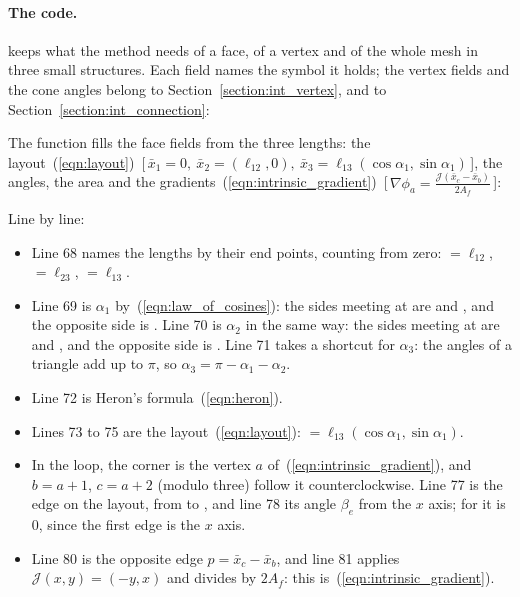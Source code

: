 \paragraph{The code.}  keeps what the method needs of a face, of a vertex and of the whole mesh in three small structures. Each field names the symbol it holds; the vertex fields and the cone angles  belong to Section~\ref{section:int_vertex}, and  to Section~\ref{section:int_connection}:

The function  fills the face fields from the three lengths: the layout~(\ref{eqn:layout})~[\,$\bar x_1 = 0,\ \bar x_2 = (\ell_{12}, 0),\ \bar x_3 = \ell_{13}(\cos\alpha_1, \sin\alpha_1)$\,], the angles, the area and the gradients~(\ref{eqn:intrinsic_gradient})~[\,$\nabla\phi_a = \frac{\mathcal J(\bar x_c - \bar x_b)}{2A_f}$\,]:

Line by line:
\begin{itemize}
\item Line 68 names the lengths by their end points, counting from zero:  $= \ell_{12}$,  $= \ell_{23}$,  $= \ell_{13}$.
\item Line 69 is $\alpha_1$ by~(\ref{eqn:law_of_cosines}): the sides meeting at  are  and , and the opposite side is . Line 70 is $\alpha_2$ in the same way: the sides meeting at  are  and , and the opposite side is . Line 71 takes a shortcut for $\alpha_3$: the angles of a triangle add up to $\pi$, so $\alpha_3 = \pi - \alpha_1 - \alpha_2$.
\item Line 72 is Heron's formula~(\ref{eqn:heron}).
\item Lines 73 to 75 are the layout~(\ref{eqn:layout}):  $= \ell_{13}(\cos\alpha_1, \sin\alpha_1)$.
\item In the loop, the corner  is the vertex $a$ of~(\ref{eqn:intrinsic_gradient}), and $b = a + 1$, $c = a + 2$ (modulo three) follow it counterclockwise. Line 77 is the edge  on the layout, from  to , and line 78 its angle $\beta_e$ from the $x$ axis; for  it is $0$, since the first edge is the $x$ axis.
\item Line 80 is the opposite edge $p = \bar x_c - \bar x_b$, and line 81 applies $\mathcal J(x, y) = (-y, x)$ and divides by $2A_f$: this is~(\ref{eqn:intrinsic_gradient}).
\end{itemize}

